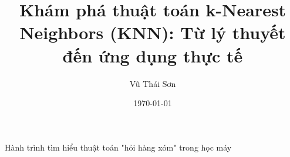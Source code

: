 \documentclass[12pt]{article}
\begin{document}
\title{Khám phá thuật toán k-Nearest Neighbors (KNN): Từ lý thuyết đến ứng dụng thực tế}

\author{Vũ Thái Sơn}

\date{\today}

\maketitle

\begin{center}
\large Hành trình tìm hiểu thuật toán "hỏi hàng xóm" trong học máy
\end{center}





\end{document}
